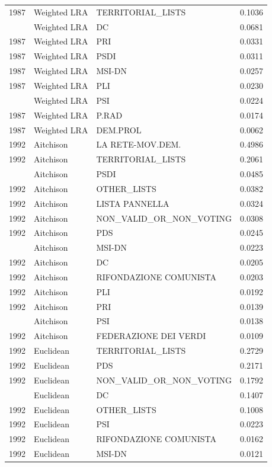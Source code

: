 \begin{longtable}[t]{rllr}
1987 & Weighted LRA & TERRITORIAL\_LISTS & 0.1036\\
\addlinespace
1987 & Weighted LRA & DC & 0.0681\\
1987 & Weighted LRA & PRI & 0.0331\\
1987 & Weighted LRA & PSDI & 0.0311\\
1987 & Weighted LRA & MSI-DN & 0.0257\\
1987 & Weighted LRA & PLI & 0.0230\\
\addlinespace
1987 & Weighted LRA & PSI & 0.0224\\
1987 & Weighted LRA & P.RAD & 0.0174\\
1987 & Weighted LRA & DEM.PROL & 0.0062\\
1992 & Aitchison & LA RETE-MOV.DEM. & 0.4986\\
1992 & Aitchison & TERRITORIAL\_LISTS & 0.2061\\
\addlinespace
1992 & Aitchison & PSDI & 0.0485\\
1992 & Aitchison & OTHER\_LISTS & 0.0382\\
1992 & Aitchison & LISTA PANNELLA & 0.0324\\
1992 & Aitchison & NON\_VALID\_OR\_NON\_VOTING & 0.0308\\
1992 & Aitchison & PDS & 0.0245\\
\addlinespace
1992 & Aitchison & MSI-DN & 0.0223\\
1992 & Aitchison & DC & 0.0205\\
1992 & Aitchison & RIFONDAZIONE COMUNISTA & 0.0203\\
1992 & Aitchison & PLI & 0.0192\\
1992 & Aitchison & PRI & 0.0139\\
\addlinespace
1992 & Aitchison & PSI & 0.0138\\
1992 & Aitchison & FEDERAZIONE DEI VERDI & 0.0109\\
1992 & Euclidean & TERRITORIAL\_LISTS & 0.2729\\
1992 & Euclidean & PDS & 0.2171\\
1992 & Euclidean & NON\_VALID\_OR\_NON\_VOTING & 0.1792\\
\addlinespace
1992 & Euclidean & DC & 0.1407\\
1992 & Euclidean & OTHER\_LISTS & 0.1008\\
1992 & Euclidean & PSI & 0.0223\\
1992 & Euclidean & RIFONDAZIONE COMUNISTA & 0.0162\\
1992 & Euclidean & MSI-DN & 0.0121\\

\end{longtable}
